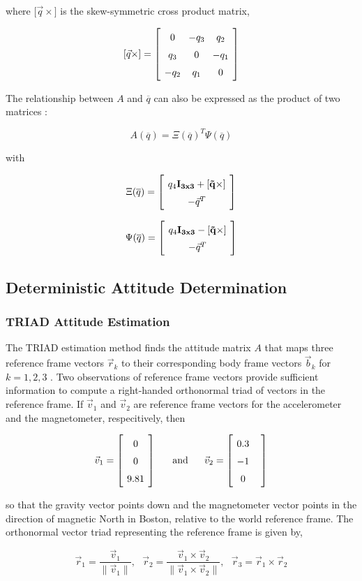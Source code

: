 \documentclass{article}
\newcommand{\mat}[2][ccccccccccccccccccccccccccccccccccccccccccccc]{\left[
        \arraycolsep=4pt\def\arraystretch{1.5}
        \begin{array}{#1} #2 \\ 
        \end{array} 
        \right]}
\newcommand{\tab}{ \textrm{ \ \ \ \ } }
\begin{document}
\begin{flushleft}
where ${[\vec{q}\times}]$ is the skew-symmetric cross product matrix, 

\[ [\vec{q}\times] = \mat{ 0 & -q_3 & q_2 \\ q_3 & 0 & -q_1 \\ -q_2 & q_1 & 0} \]

The relationship between $A$ and $\overline{q}$ can also be expressed as the product of two matrices \cite{Markley2007}: 

\[ A(\overline{q}) = \Xi(\overline{q})^{T} \Psi(\overline{q}) \]

with 

\[ \Xi(\overline{q}) = \mat{q_4 \bf{I}_{3x3} + [\vec{q}\times] \\ -\vec{q}^T } \]

\[ \Psi(\overline{q}) = \mat{q_4 \bf{I}_{3x3} - [\vec{q}\times] \\ -\vec{q}^T } \]

\subsection{Deterministic Attitude Determination}

\subsubsection{TRIAD Attitude Estimation}

The TRIAD estimation method finds the attitude matrix $A$ that maps three reference frame vectors $\vec{r}_k$ to their corresponding body frame vectors $\vec{b}_k$ for $k = 1, 2, 3$ \cite{Shuster2004}. Two observations of reference frame vectors provide sufficient information to compute a right-handed orthonormal triad of vectors in the reference frame. If $\vec{v}_1$ and $\vec{v}_2$ are reference frame vectors for the accelerometer and the magnetometer, respecitively, then 

$$ \vec{v}_1 = \mat{ 0 \\ 0 \\ 9.81 } \tab \textrm{and} \tab \vec{v}_2 = \mat{ 0.3 & \\ -1 & \\ 0 } $$ 

so that the gravity vector points down and the magnetometer vector points in the direction of magnetic North in Boston, relative to the world reference frame. The orthonormal vector triad representing the reference frame is given by, 

$$ 	\vec{r}_1 = \frac{\vec{v}_1}{\| \vec{v}_1 \|}, \tab \vec{r}_2 = \frac{\vec{v}_1 \times \vec{v}_2}{\| \vec{v}_1 \times \vec{v}_2 \|}, \tab \vec{r}_3 = \vec{r}_1 \times \vec{r}_2 $$


\end{flushleft}
\end{document}
